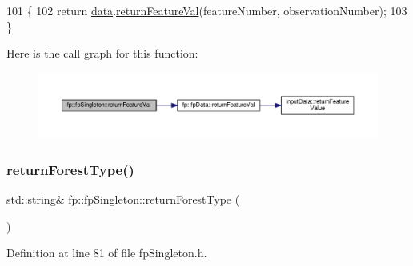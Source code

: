 \begin{DoxyCode}
101                                                                                                 \{
102                 \textcolor{keywordflow}{return} \hyperlink{classfp_1_1fpSingleton_a2fa16ac6a0f66641749032eeee61b8e9}{data}.\hyperlink{classfp_1_1fpData_a6b359086ec1e5c534095600e2ed5575f}{returnFeatureVal}(featureNumber, observationNumber);
103             \}
\end{DoxyCode}
Here is the call graph for this function\+:\nopagebreak
\begin{figure}[H]
\begin{center}
\leavevmode
\includegraphics[width=350pt]{classfp_1_1fpSingleton_aacc2eb894a219e2fe234743b51fa1a76_cgraph}
\end{center}
\end{figure}
\mbox{\label{classfp_1_1fpSingleton_af7582b20b48b7eb8c0a6b89fbdf170ab}} 
\subsubsection{\texorpdfstring{return\+Forest\+Type()}{returnForestType()}}
{\footnotesize\ttfamily std\+::string\& fp\+::fp\+Singleton\+::return\+Forest\+Type (\begin{DoxyParamCaption}{ }\end{DoxyParamCaption})\hspace{0.3cm}{\ttfamily [inline]}}



Definition at line 81 of file fp\+Singleton.\+h.


